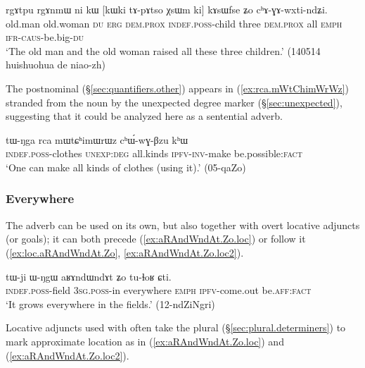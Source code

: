 \begin{exe}
\ex \label{ex:XsWm.kAsWfse}
 \gll rgɤtpu rgɤnmɯ ni kɯ [kɯki tɤ-pɤtso χsɯm ki] kɤsɯfse ʑo cʰɤ-ɣɤ-wxti-ndʑi. \\
 old.man old.woman \textsc{du} \textsc{erg} \textsc{dem}.\textsc{prox} \textsc{indef}.\textsc{poss}-child three \textsc{dem}.\textsc{prox} all \textsc{emph} \textsc{ifr}-\textsc{caus}-be.big-\textsc{du} \\
\glt `The old man and the old woman raised all these three children.' (140514 huishuohua de niao-zh)
\end{exe}
  

The postnominal  (§\ref{sec:quantifiers.other}) appears in (\ref{ex:rca.mWtChimWrWz}) stranded from the noun  by the unexpected degree marker  (§\ref{sec:unexpected}), suggesting that it could be analyzed here as a sentential adverb.

\begin{exe}
\ex \label{ex:rca.mWtChimWrWz}
\gll tɯ-ŋga rca mɯtɕʰimɯrɯz cʰɯ́-wɣ-βzu kʰɯ \\
\textsc{indef}.\textsc{poss}-clothes \textsc{unexp}:\textsc{deg} all.kinds \textsc{ipfv}-\textsc{inv}-make be.possible:\textsc{fact} \\
\glt `One can make all kinds of clothes (using it).' (05-qaZo) 
\end{exe}

\subsubsection{Everywhere} \label{sec:everywhere}
The adverb  can be used on its own, but also together with overt locative adjuncts (or goals); it can both precede (\ref{ex:aRAndWndAt.Zo.loc}) or follow it  (\ref{ex:loc.aRAndWndAt.Zo}, \ref{ex:aRAndWndAt.Zo.loc2}). 

 \begin{exe}
\ex \label{ex:loc.aRAndWndAt.Zo}
\gll tɯ-ji ɯ-ŋgɯ aʁɤndɯndɤt ʑo tu-ɬoʁ ɕti. \\
\textsc{indef}.\textsc{poss}-field \textsc{3sg}.\textsc{poss}-in everywhere \textsc{emph} \textsc{ipfv}-come.out be.\textsc{aff}:\textsc{fact} \\
\glt `It grows everywhere in the fields.' (12-ndZiNgri)
\end{exe} 

Locative adjuncts used with  often take the plural  (§\ref{sec:plural.determiners}) to mark approximate location as in (\ref{ex:aRAndWndAt.Zo.loc}) and (\ref{ex:aRAndWndAt.Zo.loc2}).

